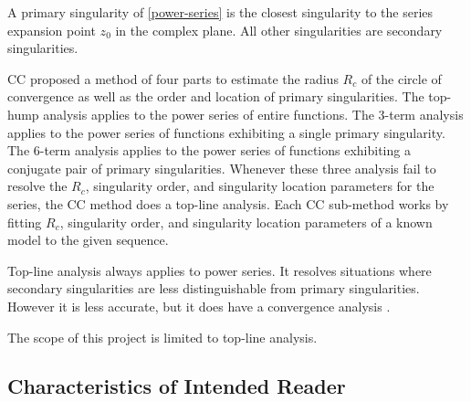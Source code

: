 \documentclass[12pt]{article}
\begin{document}
A primary singularity of \eqref{power-series} is the closest singularity to the series
expansion point $z_0$ in the complex plane. All other singularities are secondary singularities.

CC proposed a method of four parts to estimate the radius $R_c$ of the circle of convergence
as well as the order and location of primary singularities. The top-hump analysis applies to
the power series of entire functions. The 3-term analysis applies to the power series of
functions exhibiting a single primary singularity. The 6-term analysis applies to the
power series of functions exhibiting a conjugate pair of primary singularities.
Whenever these three analysis fail to resolve the $R_c$, singularity order, and
singularity location parameters for the series, the CC method does
a top-line analysis. Each CC sub-method works by fitting $R_c$, singularity order, and
singularity location parameters of a known model to the given sequence.

Top-line analysis always applies to power series. It resolves situations where secondary singularities are
less distinguishable from primary singularities. However it is less accurate, but it does
have a convergence analysis \cite{chang1982}.

The scope of this  project is limited to top-line analysis.



\subsection{Characteristics of Intended Reader} \label{sec_IntendedReader}
\end{document}
